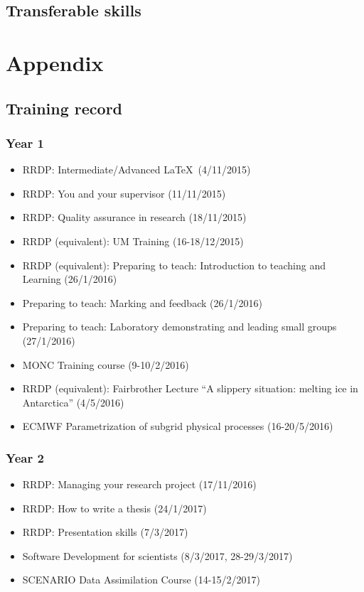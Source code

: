 \documentclass[11pt,a4paper]{article}
\begin{document}
\subsection{Transferable skills}

\printbibliography[title={References}]

\newpage
\section*{Appendix}

\subsection*{Training record}
\subsubsection*{Year 1}

\begin{itemize}
  \item RRDP: Intermediate/Advanced \LaTeX\ (4/11/2015)
  \item RRDP: You and your supervisor (11/11/2015)
  \item RRDP: Quality assurance in research (18/11/2015)
  \item RRDP (equivalent): UM Training (16-18/12/2015)
  \item RRDP (equivalent): Preparing to teach: Introduction to teaching and Learning (26/1/2016)
  \item Preparing to teach: Marking and feedback (26/1/2016)
  \item Preparing to teach: Laboratory demonstrating and leading small groups (27/1/2016)
  \item MONC Training course (9-10/2/2016)
  \item RRDP (equivalent): Fairbrother Lecture ``A slippery situation: melting ice in Antarctica'' (4/5/2016)
  \item ECMWF Parametrization of subgrid physical processes (16-20/5/2016)
\end{itemize}

\subsubsection*{Year 2}

\begin{itemize}
  \item RRDP: Managing your research project (17/11/2016)
  \item RRDP: How to write a thesis (24/1/2017)
  \item RRDP: Presentation skills (7/3/2017)
  \item Software Development for scientists (8/3/2017, 28-29/3/2017)
  \item SCENARIO Data Assimilation Course (14-15/2/2017)
\end{itemize}
\end{document}
